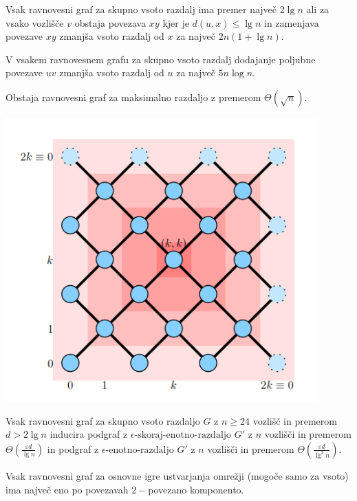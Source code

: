 \documentclass[fin1, tisk]{fmfdelo}
\begin{document}
\begin{lema}
Vsak ravnovesni graf za skupno vsoto razdalj ima premer največ $2 \lg n$ ali
za vsako vozlišče $v$ obstaja povezava $xy$ kjer je $d(u, x) \leq \lg n$ in
zamenjava povezave $xy$ zmanjša vsoto razdalj od $x$ za največ $2n(1 + \lg n)$.
\end{lema}

\begin{lema}
V vsakem ravnovesnem grafu za skupno vsoto razdalj dodajanje poljubne povezave
$uv$ zmanjša vsoto razdalj od $u$ za največ $5n \log n$.
\end{lema}

\begin{izrek}
Obstaja ravnovesni graf za maksimalno razdaljo z premerom $\Theta(\sqrt{n})$.
\end{izrek}
\includegraphics[width=0.9\textwidth]{Plagiat.png}


\begin{izrek}
Vsak ravnovesni graf za skupno vsoto razdaljo $G$ z $n \geq 24$ vozlišč in
premerom $d > 2 \lg n$ inducira podgraf z $\epsilon\text{-skoraj-enotno-razdaljo } G'$
z $n$ vozlišči in premerom $\Theta\left(\frac{\varepsilon d}{\lg n}\right)$ in
podgraf z $\epsilon\text{-enotno-razdaljo } G'$ z $n$ vozlišči in premerom
$\Theta\left(\frac{\varepsilon d}{\lg^2 n}\right)$.
\end{izrek}


\begin{izrek}
Vsak ravnovesni graf za osnovne igre ustvarjanja omrežji (mogoče samo za vsoto) ima največ eno po povezavah $2-$povezano komponento.
\end{izrek}
\end{document}
